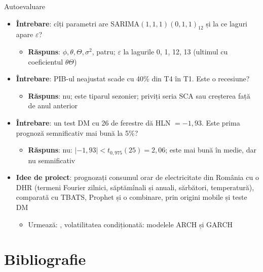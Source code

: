 \begin{frame}{Autoevaluare}
\itemsize{\footnotesize}
\begin{itemize}
    \item \textbf{Întrebare}: cîți parametri are SARIMA$(1,1,1)(0,1,1)_{12}$ și la ce laguri apare $\varepsilon$?
    \begin{itemize}
        \item \textbf{Răspuns}: $\phi, \theta, \Theta, \sigma^2$, patru; $\varepsilon$ la lagurile 0, 1, 12, 13 (ultimul cu coeficientul $\theta\Theta$)
    \end{itemize}
    \item \textbf{Întrebare}: PIB-ul neajustat scade cu 40\% din T4 în T1. Este o recesiune?
    \begin{itemize}
        \item \textbf{Răspuns}: nu; este tiparul sezonier; priviți seria SCA sau creșterea față de anul anterior
    \end{itemize}
    \item \textbf{Întrebare}: un test DM cu 26 de ferestre dă HLN $= -1{,}93$. Este prima prognoză semnificativ mai bună la 5\%?
    \begin{itemize}
        \item \textbf{Răspuns}: nu: $|-1{,}93| < t_{0{,}975}(25) = 2{,}06$; este mai bună în medie, dar nu semnificativ
    \end{itemize}
    \item \textbf{Idee de proiect}: prognozați consumul orar de electricitate din România cu o DHR (termeni Fourier zilnici, săptămînali și anuali, sărbători, temperatură), comparată cu TBATS, Prophet și o combinare, prin origini mobile și teste DM
    \begin{itemize}
        \item Urmează: , volatilitatea condiționată: modelele ARCH și GARCH
    \end{itemize}
\end{itemize}
\end{frame}


\section{Bibliografie}

